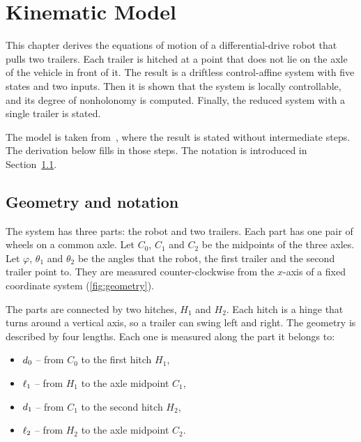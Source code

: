 %

\chapter{Kinematic Model}
\label{ch:model}

This chapter derives the equations of motion of a differential-drive robot
that pulls two trailers. Each trailer is hitched at a point that does not lie
on the axle of the vehicle in front of it. The result is a driftless
control-affine system with five states and two inputs. Then it is shown that the
system is locally controllable, and its degree of nonholonomy is computed.
Finally, the reduced system with a single trailer is stated.

The model is taken from~\cite{zuyev2024}, where the result is stated without
intermediate steps. The derivation below fills in those steps. The notation is
introduced in Section~\ref{sec:geometry}.

\section{Geometry and notation}
\label{sec:geometry}

The system has three parts: the robot and two trailers. Each part has one pair
of wheels on a common axle. Let $C_0$, $C_1$ and $C_2$ be the midpoints of the
three axles. Let $\varphi$, $\theta_1$ and $\theta_2$ be the angles that the
robot, the first trailer and the second trailer point to. They are measured
counter-clockwise from the $x$-axis of a fixed coordinate system
(\cref{fig:geometry}).

The parts are connected by two hitches, $H_1$ and $H_2$. Each hitch is a hinge
that turns around a vertical axis, so a trailer can swing left and right. The
geometry is described by four lengths. Each one is measured along the part it
belongs to:
\begin{itemize}
  \item $d_0$ -- from $C_0$ to the first hitch $H_1$,
  \item $\ell_1$ -- from $H_1$ to the axle midpoint $C_1$,
  \item $d_1$ -- from $C_1$ to the second hitch $H_2$,
  \item $\ell_2$ -- from $H_2$ to the axle midpoint $C_2$.
\end{itemize}

